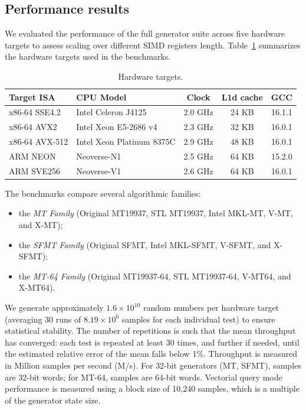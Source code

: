 \documentclass[preprint,1p,times]{elsarticle}
\begin{document}
\subsection{Performance results}
\label{sec:tests}

We evaluated the performance of the full generator suite across five hardware targets to assess scaling over different SIMD registers length. Table~\ref{table:hardware} summarizes the hardware targets used in the benchmarks.

\begin{table}[H]
	\centering
	\small
	\begin{tabular}{|l|l|c|c|c|}
		\hline
		\textbf{Target ISA} & \textbf{CPU Model} & \textbf{Clock} & \textbf{L1d cache} & \textbf{GCC} \\
		\hline
		x86-64 SSE4.2  & Intel Celeron J4125        & 2.0 GHz & 24 KB & 16.1.1 \\
		x86-64 AVX2    & Intel Xeon E5-2686 v4      & 2.3 GHz & 32 KB & 16.0.1 \\
		x86-64 AVX-512 & Intel Xeon Platinum 8375C  & 2.9 GHz & 48 KB & 16.0.1 \\
		ARM NEON       & Neoverse-N1                & 2.5 GHz & 64 KB & 15.2.0 \\
		ARM SVE256     & Neoverse-V1                & 2.6 GHz & 64 KB & 16.0.1 \\
		\hline
	\end{tabular}
	\caption{\label{table:hardware} Hardware targets.}
\end{table}

The benchmarks compare several algorithmic families:
\begin{itemize}
	\item the \textit{MT Family} (Original MT19937, STL MT19937, Intel MKL-MT, V-MT, and X-MT);
	\item the \textit{SFMT Family} (Original SFMT, Intel MKL-SFMT, V-SFMT, and X-SFMT);
	\item the \textit{MT-64 Family} (Original MT19937-64, STL MT19937-64, V-MT64, and X-MT64).
\end{itemize}
We generate approximately $1.6 \times 10^{10}$ random numbers per hardware target (averaging 30 runs of $8.19 \times 10^6$ samples for each individual test) to ensure statistical stability. The number of repetitions is such that the mean throughput has converged: each test is repeated at least 30 times, and further if needed, until the estimated relative error of the mean falls below 1\%.
Throughput is measured in Million samples per second (M/s). For 32-bit generators (MT, SFMT), samples are 32-bit words; for MT-64, samples are 64-bit words. Vectorial query mode performance is measured using a block size of 10,240 samples, which is a multiple of the generator state size.
\end{document}
